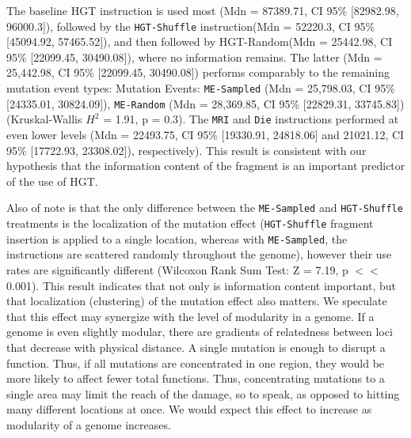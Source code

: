 \documentclass[PhD]{msu-thesis}
\begin{document}
The baseline HGT instruction is used most (Mdn = 87389.71, CI 95\% [82982.98, 96000.3]), followed by the \texttt{HGT-Shuffle} instruction(Mdn = 52220.3, CI 95\% [45094.92, 57465.52]), and then followed by {HGT-Random}(Mdn = 25442.98, CI 95\% [22099.45, 30490.08]), where no information remains.
The latter (Mdn = 25,442.98, CI 95\% [22099.45, 30490.08]) performs comparably to the remaining mutation event types: Mutation Events: \texttt{ME-Sampled} (Mdn = 25,798.03, CI 95\% [24335.01, 30824.09]), \texttt{ME-Random} (Mdn = 28,369.85, CI 95\% [22829.31, 33745.83]) (Kruskal-Wallis $H^2$ = 1.91, p = 0.3). The \texttt{MRI} and \texttt{Die} instructions performed at even lower levels (Mdn = 22493.75, CI 95\% [19330.91, 24818.06] and 21021.12, CI 95\% [17722.93, 23308.02]), respectively).
This result is consistent with our hypothesis that the information content of the fragment is an important predictor of the use of HGT. 

Also of note is that the only difference between the \texttt{ME-Sampled} and \texttt{HGT-Shuffle} treatments is the localization of the mutation effect
(\texttt{HGT-Shuffle} fragment insertion is applied to a single location, whereas with \texttt{ME-Sampled}, the instructions are scattered randomly throughout the genome), however their use rates are significantly different (Wilcoxon Rank Sum Test: Z = 7.19, p $<<$ 0.001). This result indicates that not only is information content important, but that localization (clustering) of the mutation effect also matters.
We speculate that this effect may synergize with the level of modularity in a genome. If a genome is even slightly modular, there are gradients of relatedness between loci that decrease with physical distance. A single mutation is enough to disrupt a function. Thus, if all mutations are concentrated in one region, they would be more likely to affect fewer total functions.  Thus, concentrating mutations to a single area may limit the reach of the damage, so to speak, as opposed to hitting many different locations at once. We would expect this effect to increase as modularity of a genome increases.
\end{document}
